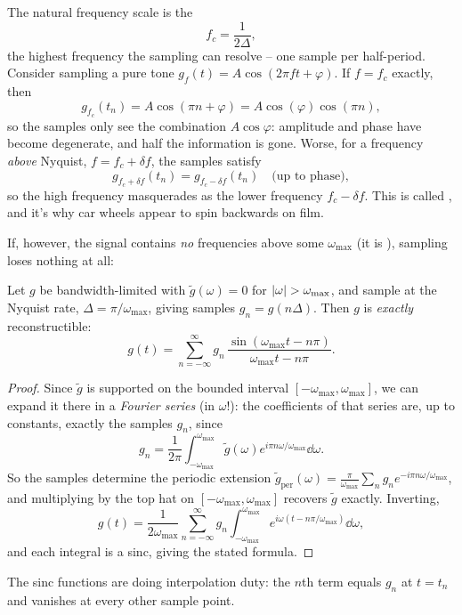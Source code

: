 \documentclass[a4paper]{scrartcl}
\begin{document}
The natural frequency scale is the 
$$
f_c = \frac{1}{2 \Delta},
$$
the highest frequency the sampling can resolve -- one sample per half-period. Consider sampling a pure tone $g_f(t) = A\cos(2 \pi f t + \varphi)$.
If $f = f_c$ exactly, then
$$
g_{f_c}(t_n) = A \cos (\pi n + \varphi) = A \cos (\varphi) \cos(\pi n),
$$
so the samples only see the combination $A \cos \varphi$: amplitude and phase have become degenerate, and half the information is gone.
Worse, for a frequency \emph{above} Nyquist, $f = f_c + \delta f$, the samples satisfy
$$
g_{f_c + \delta f}(t_n) = g_{f_c - \delta f}(t_n) \quad \text{(up to phase)},
$$
so the high frequency masquerades as the lower frequency $f_c - \delta f$. This is called , and it's why car wheels appear to spin backwards on film.

If, however, the signal contains \emph{no} frequencies above some $\omega_{\max}$ (it is ), sampling loses nothing at all:

\begin{theorem}
    Let $g$ be bandwidth-limited with $\tilde{g}(\omega) = 0$ for $\lvert\omega\rvert > \omega_{\max}$, and sample at the Nyquist rate, $\Delta = \pi / \omega_{\max}$, giving samples $g_n = g(n \Delta)$. Then $g$ is \emph{exactly} reconstructible:
    $$
    g(t) = \sum_{n = -\infty}^{\infty} g_n \, \frac{\sin (\omega_{\max}t - n \pi)}{\omega_{\max} t - n \pi}.
    $$
\end{theorem}
\begin{proof}
    Since $\tilde{g}$ is supported on the bounded interval $[-\omega_{\max}, \omega_{\max}]$, we can expand it there in a \emph{Fourier series} (in $\omega$!):
    the coefficients of that series are, up to constants, exactly the samples $g_n$, since
    $$
    g_n = \frac{1}{2\pi}\int_{-\omega_{\max}}^{\omega_{\max}} \tilde{g}(\omega) e^{i \pi n \omega/\omega_{\max}} \dd \omega.
    $$
    So the samples determine the periodic extension $\tilde{g}_{\text{per}}(\omega) = \frac{\pi}{\omega_{\max}} \sum_n g_n e^{-i \pi n \omega/\omega_{\max}}$, and multiplying by the top hat on $[-\omega_{\max}, \omega_{\max}]$ recovers $\tilde{g}$ exactly. Inverting,
    $$
    g(t) = \frac{1}{2 \omega_{\max}} \sum_{n = -\infty}^{\infty} g_n \int_{-\omega_{\max}}^{\omega_{\max}} e^{i \omega(t - n \pi/\omega_{\max})} \dd \omega,
    $$
    and each integral is a sinc, giving the stated formula.
\end{proof}

The sinc functions are doing interpolation duty: the $n$th term equals $g_n$ at $t = t_n$ and vanishes at every other sample point.
\end{document}
